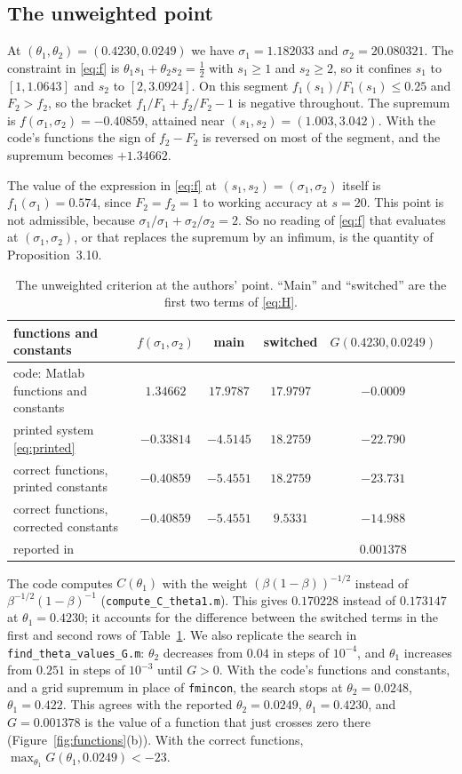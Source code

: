 \documentclass[11pt,a4paper]{amsart}
\theoremstyle{remark}
\numberwithin{equation}{section}
\begin{document}
\subsection{The unweighted point}
At $(\theta_1,\theta_2)=(0.4230,0.0249)$ we have $\sigma_1=1.182033$ and $\sigma_2=20.080321$. The constraint in
\eqref{eq:f} is $\theta_1s_1+\theta_2s_2=\frac12$ with $s_1\ge1$ and $s_2\ge2$, so it confines $s_1$ to
$[1,1.0643]$ and $s_2$ to $[2,3.0924]$. On this segment $f_1(s_1)/F_1(s_1)\le0.25$ and $F_2>f_2$, so the bracket
$f_1/F_1+f_2/F_2-1$ is negative throughout. The supremum is $f(\sigma_1,\sigma_2)=-0.40859$, attained near
$(s_1,s_2)=(1.003,3.042)$. With the code's functions the sign of $f_2-F_2$ is reversed on most of the segment, and
the supremum becomes $+1.34662$.

The value of the expression in \eqref{eq:f} at $(s_1,s_2)=(\sigma_1,\sigma_2)$ itself is $f_1(\sigma_1)=0.574$,
since $F_2=f_2=1$ to working accuracy at $s=20$. This point is not admissible, because
$\sigma_1/\sigma_1+\sigma_2/\sigma_2=2$. So no reading of \eqref{eq:f} that evaluates at $(\sigma_1,\sigma_2)$, or
that replaces the supremum by an infimum, is the quantity of Proposition~3.10.

\begin{table}[htbp]
\centering\small
\begin{tabular}{lccccc}
\toprule
functions and constants & $f(\sigma_1,\sigma_2)$ & main & switched & $G(0.4230,0.0249)$\\
\midrule
code: Matlab functions and constants & $1.34662$ & $17.9787$ & $17.9797$ & $-0.0009$\\
printed system \eqref{eq:printed} & $-0.33814$ & $-4.5145$ & $18.2759$ & $-22.790$\\
correct functions, printed constants & $-0.40859$ & $-5.4551$ & $18.2759$ & $-23.731$\\
correct functions, corrected constants & $-0.40859$ & $-5.4551$ & $9.5331$ & $-14.988$\\
\midrule
reported in \cite[\S5]{NX} & & & & $0.001378$\\
\bottomrule
\end{tabular}
\caption{The unweighted criterion at the authors' point. ``Main'' and ``switched'' are the first two terms of
\eqref{eq:H}.}
\label{tab:G}
\end{table}

The code computes $C(\theta_1)$ with the weight $(\beta(1-\beta))^{-1/2}$ instead of $\beta^{-1/2}(1-\beta)^{-1}$
(\texttt{compute\_C\_theta1.m}). This gives $0.170228$ instead of $0.173147$ at $\theta_1=0.4230$; it accounts for
the difference between the switched terms in the first and second rows of Table~\ref{tab:G}. We also replicate
the search in \texttt{find\_theta\_values\_G.m}: $\theta_2$ decreases from $0.04$ in steps of $10^{-4}$, and
$\theta_1$ increases from $0.251$ in steps of $10^{-3}$ until $G>0$. With the code's functions and constants, and a
grid supremum in place of \texttt{fmincon}, the search stops at $\theta_2=0.0248$, $\theta_1=0.422$. This agrees
with the reported $\theta_2=0.0249$, $\theta_1=0.4230$, and $G=0.001378$ is the value of a function that just
crosses zero there (Figure~\ref{fig:functions}(b)). With the correct functions,
$\max_{\theta_1}G(\theta_1,0.0249)<-23$.
\end{document}
